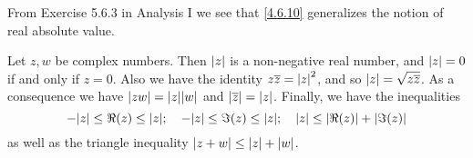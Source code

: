 \begin{note}
  From Exercise 5.6.3 in Analysis I we see that \cref{4.6.10} generalizes the notion of real absolute value.
\end{note}

\begin{lemma}\label{4.6.11}
  Let \(z, w\) be complex numbers.
  Then \(\left\lvert z\right\rvert\) is a non-negative real number, and \(\left\lvert z\right\rvert = 0\) if and only if \(z = 0\).
  Also we have the identity \(z \overline{z} = \left\lvert z\right\rvert^2\), and so \(\left\lvert z\right\rvert = \sqrt{z \overline{z}}\).
  As a consequence we have \(\abs{zw} = \abs{z} \abs{w}\) and \(\left\lvert\overline{z}\right\rvert = \left\lvert z\right\rvert\).
  Finally, we have the inequalities
  \[
    -\abs{z} \leq \Re(z) \leq \abs{z}; \quad -\abs{z} \leq \Im(z) \leq \abs{z}; \quad \abs{z} \leq \abs{\Re(z)} + \abs{\Im(z)}
  \]
  as well as the triangle inequality \(\left\lvert z + w\right\rvert \leq \left\lvert z\right\rvert + \left\lvert w\right\rvert\).
\end{lemma}

